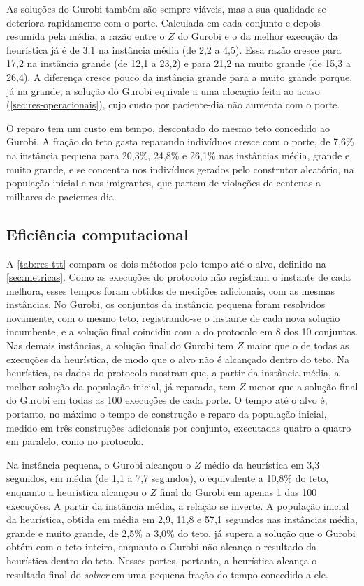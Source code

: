 As soluções do Gurobi também são sempre viáveis, mas a sua qualidade se deteriora rapidamente com o porte. Calculada em cada conjunto e depois resumida pela média, a razão entre o $Z$ do Gurobi e o da melhor execução da heurística já é de 3,1 na instância média (de 2,2 a 4,5). Essa razão cresce para 17,2 na instância grande (de 12,1 a 23,2) e para 21,2 na muito grande (de 15,3 a 26,4). A diferença cresce pouco da instância grande para a muito grande porque, já na grande, a solução do Gurobi equivale a uma alocação feita ao acaso (\autoref{sec:res-operacionais}), cujo custo por paciente-dia não aumenta com o porte.

O reparo tem um custo em tempo, descontado do mesmo teto concedido ao Gurobi. A fração do teto gasta reparando indivíduos cresce com o porte, de 7,6\% na instância pequena para 20,3\%, 24,8\% e 26,1\% nas instâncias média, grande e muito grande, e se concentra nos indivíduos gerados pelo construtor aleatório, na população inicial e nos imigrantes, que partem de violações de centenas a milhares de pacientes-dia.


\subsection{Eficiência computacional}
\label{sec:res-esforco}

A \autoref{tab:res-ttt} compara os dois métodos pelo tempo até o alvo, definido na \autoref{sec:metricas}. Como as execuções do protocolo não registram o instante de cada melhora, esses tempos foram obtidos de medições adicionais, com as mesmas instâncias. No Gurobi, os conjuntos da instância pequena foram resolvidos novamente, com o mesmo teto, registrando-se o instante de cada nova solução incumbente, e a solução final coincidiu com a do protocolo em 8 dos 10 conjuntos. Nas demais instâncias, a solução final do Gurobi tem $Z$ maior que o de todas as execuções da heurística, de modo que o alvo não é alcançado dentro do teto. Na heurística, os dados do protocolo mostram que, a partir da instância média, a melhor solução da população inicial, já reparada, tem $Z$ menor que a solução final do Gurobi em todas as 100 execuções de cada porte. O tempo até o alvo é, portanto, no máximo o tempo de construção e reparo da população inicial, medido em três construções adicionais por conjunto, executadas quatro a quatro em paralelo, como no protocolo.

Na instância pequena, o Gurobi alcançou o $Z$ médio da heurística em 3,3 segundos, em média (de 1,1 a 7,7 segundos), o equivalente a 10,8\% do teto, enquanto a heurística alcançou o $Z$ final do Gurobi em apenas 1 das 100 execuções. A partir da instância média, a relação se inverte. A população inicial da heurística, obtida em média em 2,9, 11,8 e 57,1 segundos nas instâncias média, grande e muito grande, de 2,5\% a 3,0\% do teto, já supera a solução que o Gurobi obtém com o teto inteiro, enquanto o Gurobi não alcança o resultado da heurística dentro do teto. Nesses portes, portanto, a heurística alcança o resultado final do \textit{solver} em uma pequena fração do tempo concedido a ele.

